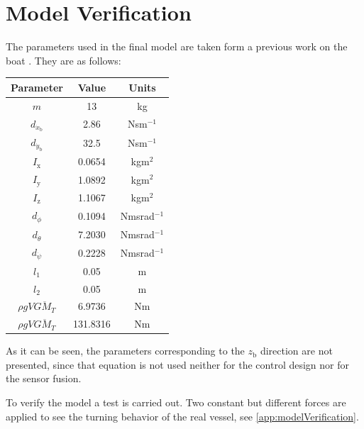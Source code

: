 \section{Model Verification}\label{sec:modelVerification}
The parameters used in the final model are taken form a previous work on the boat \cite{thesis}. They are as follows:

\begin{table}[H]
    \begin{tabular}{|c|c|c|}    
        \hline %
        \textbf{Parameter} &\textbf{Value} & \textbf{Units} \\
        \hline %
        $m$  & 13 & kg \\
        $d_{\dot{x}_\mathrm{b}}$  & 2.86 & Nsm$^{-1}$ \\
        $d_{\dot{y}_\mathrm{b}}$  & 32.5 & Nsm$^{-1}$ \\
        $I_\mathrm{x}$  & 0.0654 & kgm$^2$ \\
        $I_\mathrm{y}$  & 1.0892 & kgm$^2$ \\
        $I_\mathrm{z}$  & 1.1067 & kgm$^2$ \\
        $d_{\dot{\phi}}$ & 0.1094 &  Nmsrad$^{-1}$\\
        $d_{\dot{\theta}}$ & 7.2030 & Nmsrad$^{-1}$ \\
        $d_{\dot{\psi}}$ & 0.2228 & Nmsrad$^{-1}$ \\
        $l_1$ & 0.05 & m \\
        $l_2$ & 0.05 & m \\
        $\rho g V \overline{GM_{T}}$ & 6.9736 & Nm\\
        $\rho g V \overline{GM_{T}}$ & 131.8316 & Nm\\
        \hline %
    \end{tabular}
\end{table}

As it can be seen, the parameters corresponding to the $z_\mathrm{b}$ direction are not presented, since that equation is not used neither for the control design nor for the sensor fusion.

To verify the model a test is carried out. Two constant but different forces are applied to see the turning behavior of the real vessel, see \autoref{app:modelVerification}.

